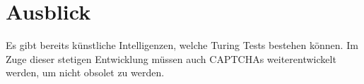 \chapter{Ausblick}

Es gibt bereits künstliche Intelligenzen, welche Turing Tests bestehen können.
Im Zuge dieser stetigen Entwicklung müssen auch CAPTCHAs weiterentwickelt werden,
um nicht obsolet zu werden. 
